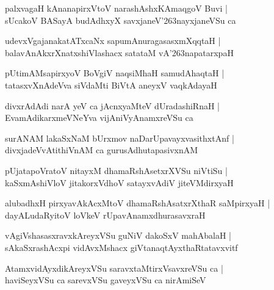 \documentclass[twoside,12pt,openright]{book}
\def\S{\char'263}
\newcounter{shloka}[chapter]
\begin{document}
\begin{shloka}%
palxvagaH kAnanapirxVtoV narashAshxKAmaqgoV Buvi |\\
sUcakoV BASayA budAdhxyX savxjaneV\S nayxjaneVSu ca 
\end{shloka}

\begin{shloka}%
udevxVgajanakatATxcaNx sapumAnuragasasxmXqqtaH |\\
balavAnAkxrXnatxshiVlashacx satataM vA\S napatarxpaH 
\end{shloka}

\begin{shloka}%
pUtimAMsapirxyoV BoVgiV naqsiMhaH samudAhaqtaH |\\
tatasxvXnAdeVva siVdaMti BiVtA aneyxV vaqkAdayaH 
\end{shloka}

\begin{shloka}%
divxrAdAdi narA yeV ca jAcnxyaMteV dUradashiRnaH |\\
EvamAdikarxmeVNeYva vijAniVyAnamxreVSu ca 
\end{shloka}

\begin{shloka}%
surANAM lakaSxNaM bUrxmov naDarUpavayxvasithxtAnf |\\
divxjadeVvAtithiVnAM ca gurusAdhutapasivxnAM 
\end{shloka}

\begin{shloka}%
pUjatapoVratoV nitayxM dhamaRshAsetxrXVSu niVtiSu |\\
kaSxmAshiVloV jitakorxVdhoV satayxvAdiV jiteVMdirxyaH 
\end{shloka}

\begin{shloka}%
alubadhxH pirxyavAkAcxMtoV dhamaRshAsatxrXthaR saMpirxyaH |\\
dayALudaRyitoV loVkeV rUpavAnamxdhurasavxraH 
\end{shloka}

\begin{shloka}%
vAgiVshasasxravxkAreyxVSu guNiV dakoSxV mahAbalaH |\\
sAkaSxrashAcxpi vidAvxMshacx giVtanaqtAyxthaRtatavxvitf 
\end{shloka}

\begin{shloka}%
AtamxvidAyxdikAreyxVSu saravxtaMtirxVsavxreVSu ca |\\
haviSeyxVSu ca sarevxVSu gaveyxVSu ca nirAmiSeV 
\end{shloka}
\end{document}

